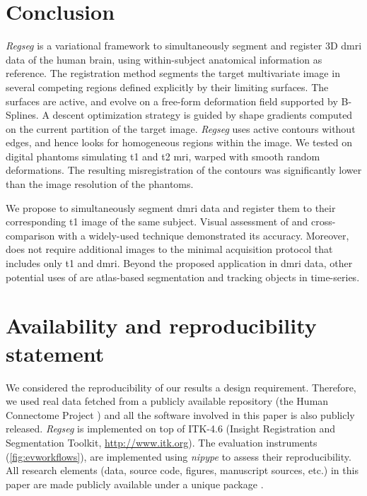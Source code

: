 \section*{Conclusion}
\label{sec:conclusion}

\emph{Regseg} is a variational framework to simultaneously segment and
  register 3D \gls*{dmri} data of the human brain, using within-subject
  anatomical information as reference.
The registration method segments the target multivariate image in several competing regions
  defined explicitly by their limiting surfaces.
The surfaces are active, and evolve on a free-form deformation field supported by B-Splines.
A descent optimization strategy is guided by shape gradients computed on the current partition
  of the target image.
\emph{Regseg} uses active contours without edges, and hence looks for
  homogeneous regions within the image.
We tested \regseg{} on digital phantoms simulating \gls*{t1} and \gls*{t2} \gls*{mri},
	warped with smooth random deformations.
The resulting misregistration of the contours was significantly lower than the image resolution
  of the phantoms.

We propose \regseg{} to simultaneously segment \gls*{dmri} data and register them to
  their corresponding \gls*{t1} image of the same subject.
Visual assessment of \regseg{} and cross-comparison with a widely-used technique demonstrated 
  its accuracy.
Moreover, \regseg{} does not require additional images to the minimal acquisition protocol
  that includes only \gls*{t1} and \gls*{dmri}.
Beyond the proposed application in \gls*{dmri} data, other potential uses of \regseg{} are
  atlas-based segmentation and tracking objects in time-series.


\section*{Availability and reproducibility statement}
\label{sec:availability}
We considered the reproducibility of our results a design requirement.
Therefore, we used real data fetched from a publicly available repository
  (the Human Connectome Project \citep{essen_human_2012}) and all the software
  involved in this paper is also publicly released.
\emph{Regseg} is implemented on top of ITK-4.6 (Insight Registration and 
  Segmentation Toolkit, \url{http://www.itk.org}).
The evaluation instruments (\autoref{fig:evworkflows}), are implemented using
  \emph{nipype} \citep{gorgolewski_nipype_2011} to assess their reproducibility.
All research elements (data, source code, figures, manuscript sources, etc.) in this paper
  are made publicly available under a unique package \citep{esteban_acweregistration_2015}.